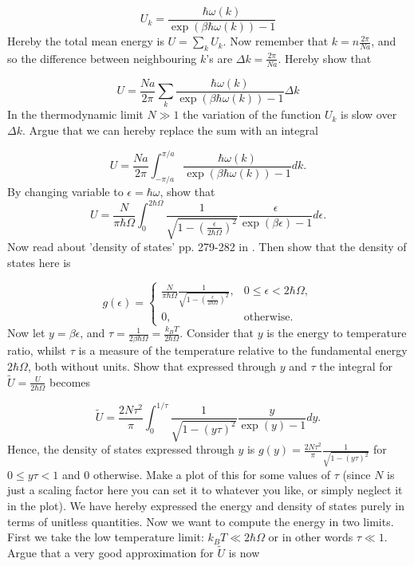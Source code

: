 \documentclass[10pt]{article}
\begin{document}
\begin{equation}
U_k = \frac{\hbar\omega(k)}{\exp(\beta\hbar\omega(k))-1}
\end{equation}
Hereby the total mean energy is $U=\sum_k U_k$. Now remember that $k=n\frac{2\pi}{Na}$, and so the difference between neighbouring $k$'s are $\Delta k = \frac{2\pi}{Na}$. Hereby show that

\begin{equation}
U = \frac{Na}{2\pi}\sum_k\frac{\hbar\omega(k)}{\exp(\beta\hbar\omega(k))-1}\Delta k 
\end{equation}
In the thermodynamic limit $N\gg 1$ the variation of the function $U_k$ is slow over $\Delta k$. Argue that we can hereby replace the sum with an integral

\begin{equation}
U = \frac{Na}{2\pi}\int_{-\pi/a}^{\pi/a}\frac{\hbar\omega(k)}{\exp(\beta\hbar\omega(k))-1}dk.
\end{equation}
By changing variable to $\epsilon =\hbar\omega$, show that
\begin{equation}
U = \frac{N}{\pi\hbar\Omega}\int_{0}^{2\hbar\Omega}\frac{1}{\sqrt{1-\left(\frac{\epsilon}{2\hbar\Omega}\right)^2}}\frac{\epsilon}{\exp(\beta\epsilon)-1}d\epsilon.
\end{equation}
Now read about 'density of states' pp. 279-282 in \cite{Schroeder}. Then show that the density of states here is

\begin{equation}
g(\epsilon) = \left\{\begin{matrix}
 \frac{N}{\pi \hbar\Omega}\frac{1}{\sqrt{1-\left(\frac{\epsilon}{2\hbar\Omega}\right)^2}}, & 0 \leq \epsilon < 2\hbar\Omega, \\ 
0, & \text{otherwise}.  
\end{matrix}\right. 
\end{equation}
Now let $y = \beta\epsilon$, and $\tau = \frac{1}{2\beta\hbar\Omega} = \frac{k_BT}{2\hbar\Omega}$. Consider that $y$ is the energy to temperature ratio, whilst $\tau$ is a measure of the temperature relative to the fundamental energy $2\hbar\Omega$, both without units. Show that expressed through $y$ and $\tau$ the integral for $\tilde{U}=\frac{U}{2\hbar\Omega}$ becomes

\begin{equation}
\tilde{U} = \frac{2N\tau^2}{\pi}\int_{0}^{1/\tau}\frac{1}{\sqrt{1-\left(y\tau\right)^2}}\frac{y}{\exp(y)-1}dy.
\label{eq.U_unitless}
\end{equation}
Hence, the density of states expressed through $y$ is $g(y)=\frac{2N\tau^2}{\pi}\frac{1}{\sqrt{1-\left(y\tau\right)^2}}$ for $0\leq y\tau<1$ and $0$ otherwise. Make a plot of this for some values of $\tau$ (since $N$ is just a scaling factor here you can set it to whatever you like, or simply neglect it in the plot). We have hereby expressed the energy and density of states purely in terms of unitless quantities. Now we want to compute the energy in two limits. First we take the low temperature limit: $k_BT\ll 2\hbar\Omega$ or in other words $\tau \ll 1$. Argue that a very good approximation for  $\tilde{U}$ is now
\end{document}

